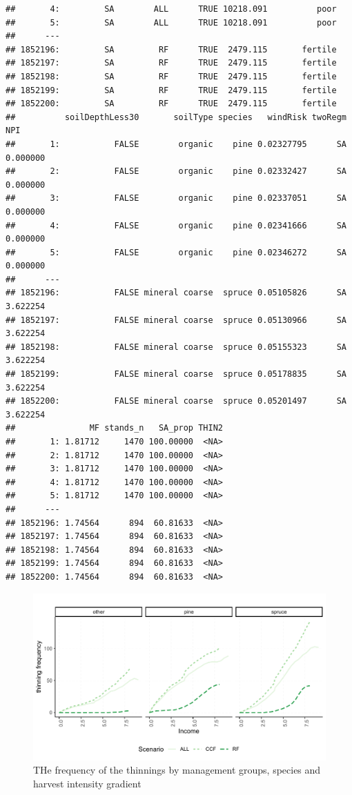\documentclass[]{elsarticle} %
\makeatletter
\def\maxwidth{\ifdim\Gin@nat@width>\linewidth\linewidth
\else\Gin@nat@width\fi}
\let\Oldincludegraphics\includegraphics
\renewcommand{\includegraphics}[1]{\Oldincludegraphics[width=\maxwidth]{#1}}
\makeatother
\begin{document}
\begin{verbatim}
##       4:         SA        ALL      TRUE 10218.091          poor
##       5:         SA        ALL      TRUE 10218.091          poor
##      ---                                                        
## 1852196:         SA         RF      TRUE  2479.115       fertile
## 1852197:         SA         RF      TRUE  2479.115       fertile
## 1852198:         SA         RF      TRUE  2479.115       fertile
## 1852199:         SA         RF      TRUE  2479.115       fertile
## 1852200:         SA         RF      TRUE  2479.115       fertile
##          soilDepthLess30       soilType species   windRisk twoRegm      NPI
##       1:           FALSE        organic    pine 0.02327795      SA 0.000000
##       2:           FALSE        organic    pine 0.02332427      SA 0.000000
##       3:           FALSE        organic    pine 0.02337051      SA 0.000000
##       4:           FALSE        organic    pine 0.02341666      SA 0.000000
##       5:           FALSE        organic    pine 0.02346272      SA 0.000000
##      ---                                                                   
## 1852196:           FALSE mineral coarse  spruce 0.05105826      SA 3.622254
## 1852197:           FALSE mineral coarse  spruce 0.05130966      SA 3.622254
## 1852198:           FALSE mineral coarse  spruce 0.05155323      SA 3.622254
## 1852199:           FALSE mineral coarse  spruce 0.05178835      SA 3.622254
## 1852200:           FALSE mineral coarse  spruce 0.05201497      SA 3.622254
##               MF stands_n   SA_prop THIN2
##       1: 1.81712     1470 100.00000  <NA>
##       2: 1.81712     1470 100.00000  <NA>
##       3: 1.81712     1470 100.00000  <NA>
##       4: 1.81712     1470 100.00000  <NA>
##       5: 1.81712     1470 100.00000  <NA>
##      ---                                 
## 1852196: 1.74564      894  60.81633  <NA>
## 1852197: 1.74564      894  60.81633  <NA>
## 1852198: 1.74564      894  60.81633  <NA>
## 1852199: 1.74564      894  60.81633  <NA>
## 1852200: 1.74564      894  60.81633  <NA>
\end{verbatim}

\begin{figure}
\centering
\includegraphics{test_manus_files/figure-latex/fig_thin_frequency-1.pdf}
\caption{THe frequency of the thinnings by management groups, species
and harvest intensity gradient}
\end{figure}
\end{document}
